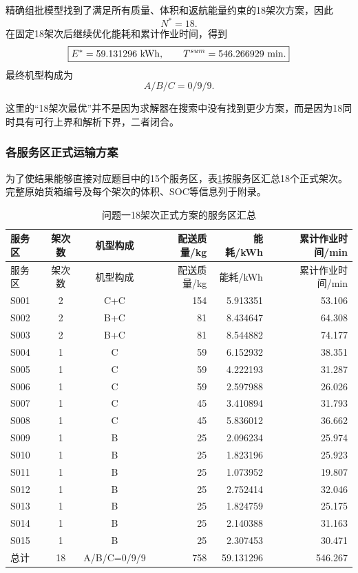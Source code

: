 \documentclass[UTF8,a4paper,12pt]{ctexart}
\begin{document}
精确组批模型找到了满足所有质量、体积和返航能量约束的18架次方案，因此
\[
\boxed{N^*=18}.
\]
在固定18架次后继续优化能耗和累计作业时间，得到
\[
\boxed{
E^*=59.131296\ {\rm kWh},
\qquad
T^{sum}=546.266929\ {\rm min}.
}
\]
最终机型构成为
\[
\boxed{A/B/C=0/9/9}.
\]

这里的“18架次最优”并不是因为求解器在搜索中没有找到更少方案，而是因为18同时具有可行上界和解析下界，二者闭合。

\subsubsection{各服务区正式运输方案}

为了使结果能够直接对应题目中的15个服务区，表\ref{tab:q1_area_plan}按服务区汇总18个正式架次。完整原始货箱编号及每个架次的体积、SOC等信息列于附录。

\scriptsize
\begin{longtable}{lccrrr}
\caption{问题一18架次正式方案的服务区汇总}\label{tab:q1_area_plan}\\
\toprule
服务区 & 架次数 & 机型构成 & 配送质量/kg & 能耗/kWh & 累计作业时间/min\\
\midrule
\endfirsthead
\toprule
服务区 & 架次数 & 机型构成 & 配送质量/kg & 能耗/kWh & 累计作业时间/min\\
\midrule
\endhead
S001 & 2 & C+C & 154 & 5.913351 & 53.106\\
S002 & 2 & B+C & 81 & 8.434647 & 64.308\\
S003 & 2 & B+C & 81 & 8.544882 & 74.177\\
S004 & 1 & C & 59 & 6.152932 & 38.351\\
S005 & 1 & C & 59 & 4.222193 & 31.287\\
S006 & 1 & C & 59 & 2.597988 & 26.026\\
S007 & 1 & C & 45 & 3.410894 & 31.793\\
S008 & 1 & C & 45 & 5.836012 & 36.662\\
S009 & 1 & B & 25 & 2.096234 & 25.974\\
S010 & 1 & B & 25 & 1.823196 & 25.923\\
S011 & 1 & B & 25 & 1.073952 & 19.807\\
S012 & 1 & B & 25 & 2.752414 & 32.046\\
S013 & 1 & B & 25 & 1.824759 & 25.175\\
S014 & 1 & B & 25 & 2.140388 & 31.163\\
S015 & 1 & B & 25 & 2.307453 & 30.471\\
\midrule
总计 & 18 & A/B/C=0/9/9 & 758 & 59.131296 & 546.267\\
\bottomrule
\end{longtable}
\normalsize
\end{document}
